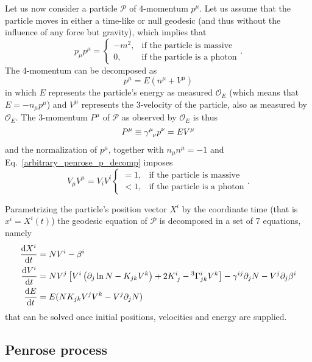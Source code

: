 Let us now consider a particle $\mathcal{P}$ of 4-momentum $p^\mu$. Let us assume that the particle moves in either a time-like or null geodesic (and thus without the influence of any force but gravity), which implies that
%
\begin{equation}
  p_\mu p^\mu = \left\{
  \begin{array}{lr}
    -m^2, & \text{if the particle is massive}  \\
    0,    & \text{if the particle is a photon}
  \end{array}
  \right. .
  \label{eq:arbitrary_penrose_p_norm}
\end{equation}
%
The 4-momentum can be decomposed as
%
\begin{equation}
  p^\mu = E(n^\mu + V^\mu)
  \label{arbitrary_penrose_p_decomp}
\end{equation}
%
in which $E$ represents the particle's energy as measured $\mathcal{O}_E$ (which means that $E = - n_\mu p^\mu$) and $V^\mu$ represents the 3-velocity of the particle, also as measured by $\mathcal{O}_E$. The 3-momentum $P^\mu$ of $\mathcal{P}$ as observed by $\mathcal{O}_E$ is thus
%
\begin{equation}
  P^\mu \equiv \tens{\gamma}{\mu}{\nu} p^\nu = E V^\mu
  \label{arbitrary_penrose_3_momentum}
\end{equation}
%
and the normalization of $p^\mu$, together with $n_\mu n^\mu = -1$ and Eq.~\eqref{arbitrary_penrose_p_decomp} imposes
%
\begin{equation}
  V_\mu V^\mu = V_i V^i \left\{
  \begin{array}{lr}
    = 1, & \text{if the particle is massive}  \\
    < 1, & \text{if the particle is a photon}
  \end{array}
  \right. .
  \label{eq:arbitrary_penrose_V_norm}
\end{equation}

Parametrizing the particle's position vector $X^i$ by the coordinate time (that is $x^i = X^i(t)$) the geodesic equation of $\mathcal{P}$ is decomposed in a set of 7 equations, namely
%
\begin{align}
  \der{X^i}{t} & = N V^i - \beta^i \label{eq:arbitrary_penrose_geodesic_eq_X}                                                                                                                                                  \\
  \der{V^i}{t} & = N V^j\left[ V^i \left( \partial_j \ln N - K_{jk} V^k \right) + 2 \tens{K}{i}{j} - {}^3\Gamma^{i}_{jk}V^k\right] - \gamma^{ij}\partial_j N - V^j\partial_j\beta^i \label{eq:arbitrary_penrose_geodesic_eq_V} \\
  \der{E}{t}   & = E (N K_{jk} V^j V^k - V^j \partial_j N) \label{eq:arbitrary_penrose_geodesic_eq_E}
\end{align}
%
that can be solved once initial positions, velocities and energy are supplied.

\subsection{Penrose process}